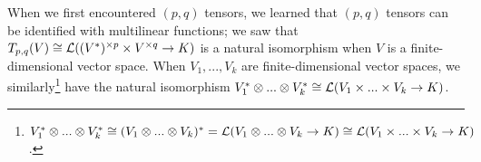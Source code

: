 


When we first encountered $(p, q)$ tensors, we learned that $(p, q)$ tensors can be identified with multilinear functions; we saw that $T_{p,q}(V) \cong \mathcal{L}((V^*)^{\times p} \times V^{\times q} \rightarrow K)$ is a natural isomorphism when $V$ is a finite-dimensional vector space. When $V_1, ..., V_k$ are finite-dimensional vector spaces, we similarly\footnote{$V_1^* \otimes ... \otimes V_k^* \cong (V_1 \otimes ... \otimes V_k)^* = \mathcal{L}(V_1 \otimes ... \otimes V_k \rightarrow K) \cong \mathcal{L}(V_1 \times ... \times V_k \rightarrow K)$.} have the natural isomorphism ${V_1^* \otimes ... \otimes V_k^* \cong \mathcal{L}(V_1 \times ... \times V_k \rightarrow K)}$.

